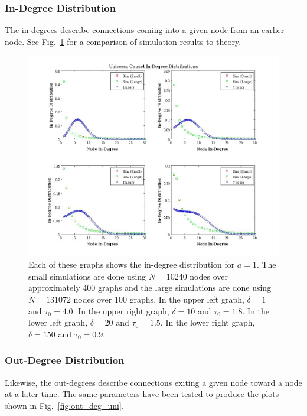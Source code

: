 \documentclass[preprint,notitlepage,amsmath,amssymb,floatfix]{revtex4-1}
\begin{document}
\subsubsection{In-Degree Distribution}
The in-degrees describe connections coming into a given node from an earlier node.
See Fig.~\ref{fig:in_deg_uni} for a comparison of simulation results to theory.

\begin{figure}
\includegraphics[width=18cm]{figures/in_degrees.jpg}
\caption{Each of these graphs shows the in-degree distribution for $a = 1$.  The small simulations are done using $N = 10240$ nodes over approximately 400 graphs and the large simulations are done using $N = 131072$ nodes over 100 graphs.  In the upper left graph, $\delta = 1$ and $\tau_0 = 4.0$.  In the upper right graph, $\delta = 10$ and $\tau_0 = 1.8$.  In the lower left graph, $\delta = 20$ and $\tau_0 = 1.5$.  In the lower right graph, $\delta = 150$ and $\tau_0 = 0.9$.}
\label{fig:in_deg_uni}
\centering
\end{figure}

\subsubsection{Out-Degree Distribution}
Likewise, the out-degrees describe connections exiting a given node toward a node at a later time.  The same parameters have been tested to produce the plots shown in Fig.~\ref{fig:out_deg_uni}.
\end{document}
